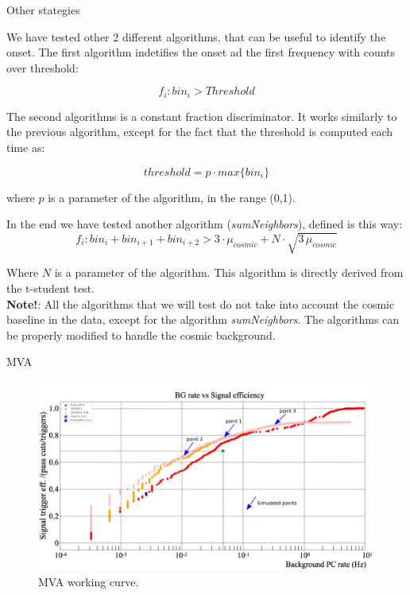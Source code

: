 \documentclass[8pt]{beamer}
\begin{document}
\begin{frame}{Other stategies}

We have tested other 2 different algorithms, that can be useful to identify the onset. The first algorithm indetifies the onset ad the first frequency with counts over threshold:

\begin{equation}
f_{i} : bin_{i} > Threshold
\end{equation}

The second algorithms is a constant fraction discriminator. It works similarly to the previous algorithm, except for the fact that the threshold is computed each time as:

\begin{equation}
threshold = p \cdot max\{bin_{i}  \}
\end{equation}

where $p$ is a parameter of the algorithm, in the range (0,1).

In the end we have tested another algorithm (\textit{sumNeighbors}), defined is this way:
\begin{equation}
f_{i} : bin_{i} + bin_{i+1} + bin_{i +2} > 3\cdot \mu_{cosmic} + N \cdot \sqrt{3 \, \mu_{cosmic}} 
\end{equation}

Where $N$ is a parameter of the algorithm. This algorithm is directly derived from the t-student test.\\
\vspace{0.5cm}
\textbf{Note!}: All the algorithms that we will test do not take into account the cosmic baseline in the data, except for the algorithm \textit{sumNeighbors}. The algorithms can be properly modified to handle the cosmic background.
\end{frame}

\begin{frame}{MVA}
\begin{figure}[hbtp]
\centering
\includegraphics[width = \textwidth]{MVA.pdf}
\caption{MVA working curve.}
\end{figure}

\end{frame}
\end{document}
